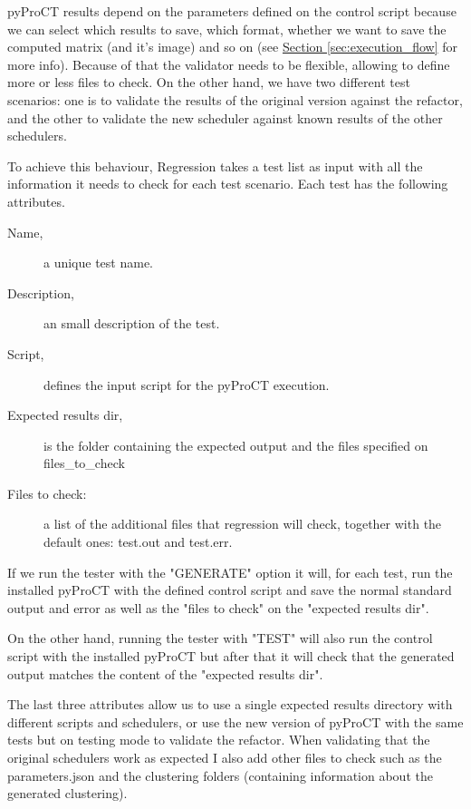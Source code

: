 pyProCT results depend on the parameters defined on the control script because we can select which results to save, which format, whether we want to save the computed matrix (and it's image) and so on (see \hyperref[sec:execution_flow]{Section \ref{sec:execution_flow}} for more info). Because of that the validator needs to be flexible, allowing to define more or less files to check. On the other hand, we have two different test scenarios: one is to validate the results of the original version against the refactor, and the other to validate the new scheduler against known results of the other schedulers.

To achieve this behaviour, Regression takes a test list as input with all the information it needs to check for each test scenario. 
Each test has the following attributes.

\begin{description}
\item [Name,] a unique test name.
\item [Description,] an small description of the test.
\item [Script,] defines the input script for the pyProCT execution. 
\item [Expected results dir,] is the folder containing the expected output and the files specified on files\_to\_check
\item [Files to check:] a list of the additional files that regression will check, together with the default ones: test.out and test.err.
\end{description}

If we run the tester with the "GENERATE" option it will, for each test, run the installed pyProCT with the defined control script and save the normal standard output and error as well as the "files to check" on the "expected results dir".

On the other hand, running the tester with "TEST" will also run the control script with the installed pyProCT but after that it will check that the generated output matches the content of the "expected results dir".

The last three attributes allow us to use a single expected results directory with different scripts and schedulers, or use the new version of pyProCT with the same tests but on testing mode to validate the refactor. When validating that the original schedulers work as expected I also add other files to check such as the parameters.json and the clustering folders (containing information about the generated clustering).

